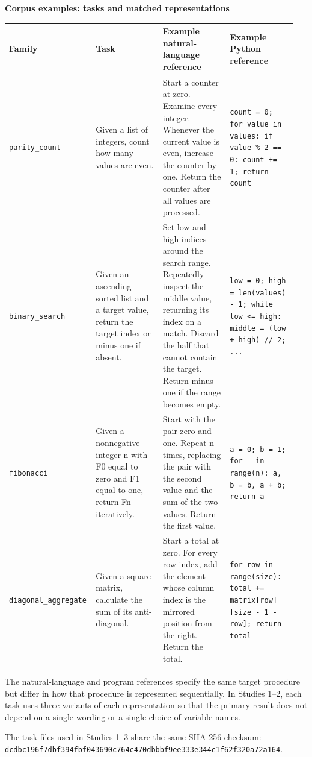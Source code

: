 \documentclass[sn-mathphys-num]{sn-jnl}
\begin{document}
\textbf{Corpus examples: tasks and matched representations}

\begin{table}[!htbp]
\centering\scriptsize
\begin{tabular}{|p{0.237\linewidth}|p{0.237\linewidth}|p{0.237\linewidth}|p{0.237\linewidth}|}
\hline
Family & Task & Example natural-language reference & Example Python reference \\ \hline
\texttt{parity\_count} & Given a list of integers, count how many values are even. & Start a counter at zero. Examine every integer. Whenever the current value is even, increase the counter by one. Return the counter after all values are processed. & \texttt{count = 0; for value in values: if value \% 2 == 0: count += 1; return count} \\ \hline
\texttt{binary\_search} & Given an ascending sorted list and a target value, return the target index or minus one if absent. & Set low and high indices around the search range. Repeatedly inspect the middle value, returning its index on a match. Discard the half that cannot contain the target. Return minus one if the range becomes empty. & \texttt{low = 0; high = len(values) - 1; while low <= high: middle = (low + high) // 2; ...} \\ \hline
\texttt{fibonacci} & Given a nonnegative integer n with F0 equal to zero and F1 equal to one, return Fn iteratively. & Start with the pair zero and one. Repeat n times, replacing the pair with the second value and the sum of the two values. Return the first value. & \texttt{a = 0; b = 1; for \_ in range(n): a, b = b, a + b; return a} \\ \hline
\texttt{diagonal\_aggregate} & Given a square matrix, calculate the sum of its anti-diagonal. & Start a total at zero. For every row index, add the element whose column index is the mirrored position from the right. Return the total. & \texttt{for row in range(size): total += matrix[row][size - 1 - row]; return total} \\ \hline
\end{tabular}
\end{table}

The natural-language and program references specify the same target procedure but differ in how that procedure is represented sequentially. In Studies 1--2, each task uses three variants of each representation so that the primary result does not depend on a single wording or a single choice of variable names.

The task files used in Studies 1--3 share the same SHA-256 checksum:
\texttt{dcdbc196f7dbf394fbf043690c764c470dbbbf9ee333e344c1f62f320a72a164}.
\end{document}

